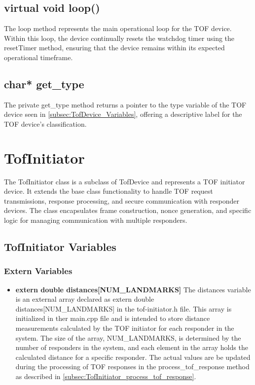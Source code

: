 \subsection{virtual void loop()}
\label{subsec:TofDevice_loop}
The loop method represents the main operational loop for the TOF device. 
Within this loop, the device continually resets the watchdog timer using the resetTimer method, ensuring that the device remains within its expected operational timeframe. 

\subsection{char* get\_type}
\label{subsec:TofDevice_get_type}
The private get\_type method returns a pointer to the type variable of the TOF device seen in \ref{subsec:TofDevice_Variables}, offering a descriptive label for the TOF device's classification.

\section{TofInitiator}
\label{sec:TofInitiator}
The TofInitiator class is a subclass of TofDevice and represents a TOF initiator device. 
It extends the base class functionality to handle TOF request transmissions, response processing, and secure communication with responder devices. 
The class encapsulates frame construction, nonce generation, and specific logic for managing communication with multiple responders.

\subsection{TofInitiator Variables}
\label{subsec:TofInitiator_Variables}

\subsubsection{Extern Variables}
\begin{itemize}
	\item \textbf{extern double distances[NUM\_LANDMARKS]}
	\newline
	The distances variable is an external array declared as extern double 
	\newline
	distances[NUM\_LANDMARKS] in the tof-initiator.h file. 
	This array is initialized in ther main.cpp file and is intended to store distance measurements calculated by the TOF initiator for each responder in the system. 
	The size of the array, NUM\_LANDMARKS, is determined by the number of responders in the system, and each element in the array holds the calculated distance for a specific responder. 
	The actual values are be updated during the processing of TOF responses in the process\_tof\_response method as described in \ref{subsec:TofInitiator_process_tof_response}.
\end{itemize}

